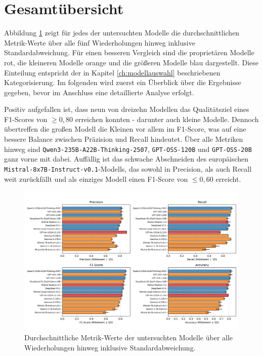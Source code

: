 \section{Gesamtübersicht}\label{sec:gesamtubersicht}

Abbildung \ref{fig:results-evaluation-metrics-comparison} zeigt für jedes der untersuchten Modelle die durchschnittlichen Metrik-Werte über alle fünf Wiederholungen hinweg inklusive Standardabweichung. Für einen besseren Vergleich sind die proprietären Modelle rot, die kleineren Modelle orange und die größeren Modelle blau dargestellt. Diese Einteilung entspricht der in Kapitel \ref{ch:modellauswahl} beschriebenen Kategorisierung. Im folgenden wird zuerst ein Überblick über die Ergebnisse gegeben, bevor im Anschluss eine detaillierte Analyse erfolgt.

Positiv aufgefallen ist, dass neun von dreizehn Modellen das Qualitätsziel eines F1-Scores von $\geq 0{,}80$ erreichen konnten - darunter auch kleine Modelle. Dennoch übertreffen die großen Modell die Kleinen vor allem im F1-Score, was auf eine bessere Balance zwischen Präzision und Recall hindeutet. Über alle Metriken hinweg sind \texttt{Qwen3-235B-A22B-Thinking-2507}, \texttt{GPT-OSS-120B} und \texttt{GPT-OSS-20B} ganz vorne mit dabei. Auffällig ist das schwache Abschneiden des europäischen \texttt{Mistral-8x7B-Instruct-v0.1}-Modells, das sowohl in Precision, als auch Recall weit zurückfällt und als einziges Modell einen F1-Score von $\le 0{,}60$ erreicht.

\begin{figure}[htbp]
    \centering
    \includegraphics[width=\textwidth,trim=20 40 20 10,clip]{images/results/evaluation_metrics_comparison}
    \caption{Durchschnittliche Metrik-Werte der untersuchten Modelle über alle Wiederholungen hinweg inklusive Standardabweichung.}
    \label{fig:results-evaluation-metrics-comparison}
\end{figure}


